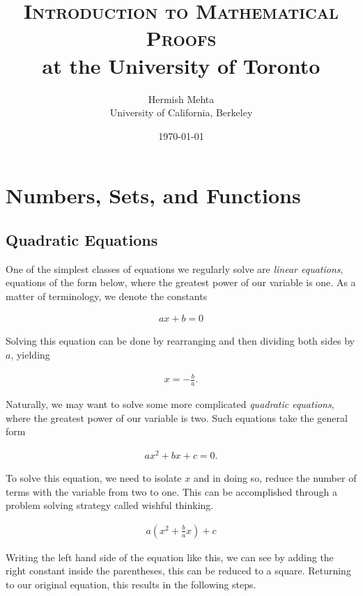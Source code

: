 \documentclass{report}
\begin{document}
\title{\textsc{Introduction to Mathematical Proofs} \\
	\large at the University of Toronto}
\author{Hermish Mehta \\ University of California, Berkeley}
\date{\today}
\maketitle

\tableofcontents

\chapter{Numbers, Sets, and Functions}
\section{Quadratic Equations}
One of the simplest classes of equations we regularly solve are \emph{linear equations},  equations of the form below, where the greatest power of our variable is one. As a matter of terminology, we denote the constants 

\begin{align}
	ax + b = 0 	
\end{align}

Solving this equation can be done by rearranging and then dividing both sides by $a$, yielding

\begin{align*}
	x = -\frac{b}{a}.
\end{align*}

Naturally, we may want to solve some more complicated \textit{quadratic equations},  where the greatest power of our variable is two. Such equations take the general form

\begin{align}
	ax^2 + bx + c = 0.
\end{align}

To solve this equation, we need to isolate $x$ and in doing so, reduce the number of terms with the variable from two to one. This can be accomplished through a problem solving strategy called wishful thinking.

\begin{align*}
	a \left( x^2 + \frac{b}{a}x \right) + c
\end{align*}

Writing the left hand side of the equation like this, we can see by adding the right constant inside the parentheses, this can be reduced to a square. Returning to our original equation, this results in the following steps.
\end{document}
